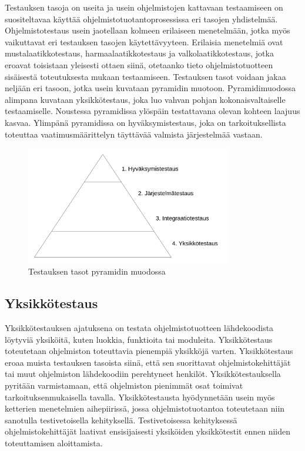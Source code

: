 Testauksen tasoja on useita ja usein ohjelmistojen kattavaan testaamiseen on suositeltavaa käyttää ohjelmistotuotantoprosessissa eri tasojen yhdistelmää.
Ohjelmistotestaus usein jaotellaan kolmeen erilaiseen menetelmään, jotka myös vaikuttavat eri testauksen tasojen käytettävyyteen.
Erilaisia menetelmiä ovat mustalaatikkotestaus, harmaalaatikkotestaus ja valkolaatikkotestaus, jotka eroavat toisistaan yleisesti ottaen siinä, otetaanko tieto ohjelmistotuotteen sisäisestä toteutuksesta mukaan testaamiseen.
Testauksen tasot voidaan jakaa neljään eri tasoon, jotka usein kuvataan pyramidin muotoon.
Pyramidimuodossa alimpana kuvataan yksikkötestaus, joka luo vahvan pohjan kokonaisvaltaiselle testaamiselle.
Noustessa pyramidissa ylöspäin testattavana olevan kohteen laajuus kasvaa.
Ylimpänä pyramidissa on hyväksymistestaus, joka on tarkoituksellista toteuttaa vaatimusmäärittelyn täyttävää valmista järjestelmää vastaan.
\begin{figure}[H]
  \centering
  \includegraphics[width=0.8\textwidth]{assets/testing-levels-pyramid.png}
  \caption{Testauksen tasot pyramidin muodossa}
  \label{fig:testing-levels-pyramid}
\end{figure}

  \subsection{Yksikkötestaus} \label{07_yksikkotestaus}

  Yksikkötestauksen ajatuksena on testata ohjelmistotuotteen lähdekoodista löytyviä yksiköitä, kuten luokkia, funktioita tai moduleita.
  Yksikkötestaus toteutetaan ohjelmiston toteuttavia pienempiä yksikköjä varten.
  Yksikkötestaus eroaa muista testauksen tasoista siinä, että sen suorittavat ohjelmistokehittäjät tai muut ohjelmiston lähdekoodiin perehtyneet henkilöt.
  Yksikkötestauksella pyritään varmistamaan, että ohjelmiston pienimmät osat toimivat tarkoituksenmukaisella tavalla.
  Yksikkötestausta hyödynnetään usein myös ketterien menetelmien aihepiirissä, jossa ohjelmistotuotantoa toteutetaan niin sanotulla testivetoisella kehityksellä.
  Testivetoisessa kehityksessä ohjelmistokehittäjät laativat ensisijaisesti yksiköiden yksikkötestit ennen niiden toteuttamisen aloittamista.

